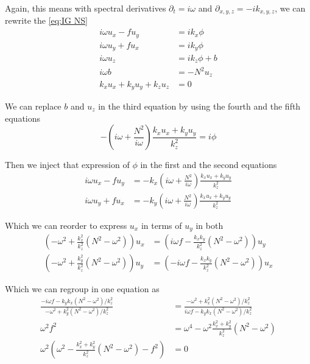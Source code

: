 Again, this means with spectral derivatives $\partial_t = i \omega$ and $\partial_{x,y,z} = -i k_{x,y,z}$, we can rewrite the \cref{eq:IG NS}
\begin{align*}
	i \omega u_x - f u_y & = i k_x \phi \\
	i \omega u_y + f u_x & = i k_y \phi \\
	i \omega u_z & = i k_z \phi + b \\
	i \omega b & = - N^2 u_z \\
	k_x u_x + k_y u_y + k_z u_z & = 0 
\end{align*}

We can replace $b$ and $u_z$ in the third equation by using the fourth and the fifth equations
\begin{equation*}
	- \left( i \omega + \frac{N^2}{i \omega} \right) \frac{k_x u_x + k_y u_y}{k_z^2} = i \phi
\end{equation*} 

Then we inject that expression of $\phi$ in the first and the second equations
\begin{align*}
	i \omega u_x - f u_y & = - k_x \left( i \omega + \frac{N^2}{i \omega} \right) \frac{k_x u_x + k_y u_y}{k_z^2} \\
	i \omega u_y + f u_x & = - k_y \left( i \omega + \frac{N^2}{i \omega} \right) \frac{k_x u_x + k_y u_y}{k_z^2}
\end{align*}

Which we can reorder to express $u_x$ in terms of $u_y$ in both 
\begin{align*}
	\left( - \omega^2 + \frac{k_x^2}{k_z^2} \left( N^2 -\omega^2 \right) \right) u_x & = \left( i \omega f - \frac{k_x k_y}{k_z^2} \left( N^2 -\omega^2 \right) \right) u_y \\
	\left( - \omega^2 + \frac{k_y^2}{k_z^2} \left( N^2 -\omega^2 \right) \right) u_y & = \left( - i \omega f - \frac{k_x k_y}{k_z^2} \left( N^2 -\omega^2 \right) \right) u_x
\end{align*}

Which we can regroup in one equation as 
\begin{align*}
	\frac{-i \omega f - k_y k_x \left(N^2 - \omega^2 \right) / k_z^2}{- \omega^2 + k_y^2 \left(N^2 - \omega^2 \right)/k_z^2 } & = \frac{- \omega^2 + k_x^2 \left(N^2 - \omega^2 \right)/k_z^2 }{i \omega f - k_y k_x \left(N^2 - \omega^2 \right) / k_z^2} \\
	\omega^2 f^2 & = \omega^4 - \omega^2 \frac{k_x^2 + k_y^2}{k_z^2}\left(N^2 - \omega^2 \right) \\
	\omega^2 \left( \omega^2 - \frac{k_x^2 + k_y^2}{k_z^2}\left(N^2 - \omega^2 \right) - f^2 \right) & = 0
\end{align*}

